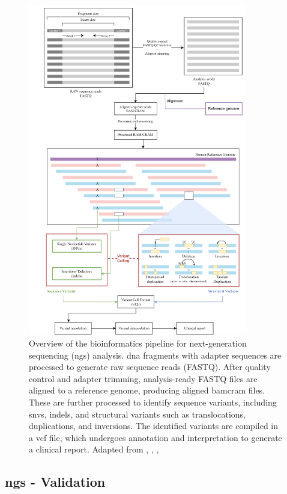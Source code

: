 \begin{figure}[H]
    \centering
    \includegraphics[width=0.85\textwidth]{figs/pipeline.png}
    \caption{Overview of the bioinformatics pipeline for next-generation sequencing (\ac{ngs}) analysis. \ac{dna} fragments with adapter sequences are processed to generate raw sequence reads (FASTQ). After quality control and adapter trimming, analysis-ready FASTQ files are aligned to a reference genome, producing aligned \ac{bam}\/\ac{cram} files. These are further processed to identify sequence variants, including \ac{snvs}, \ac{indels}, and structural variants such as translocations, duplications, and inversions. The identified variants are compiled in a \ac{vcf} file, which undergoes annotation and interpretation to generate a clinical report. Adapted from \cite{Roy2018}, \cite{pipeline}, \cite{Roy2020}, \cite{Kanzi2020}} 
    \label{fig:pipeline}
\end{figure}

\subsection{\acl{ngs} - Validation} \label{subsec:ngs_bioinformatics}

